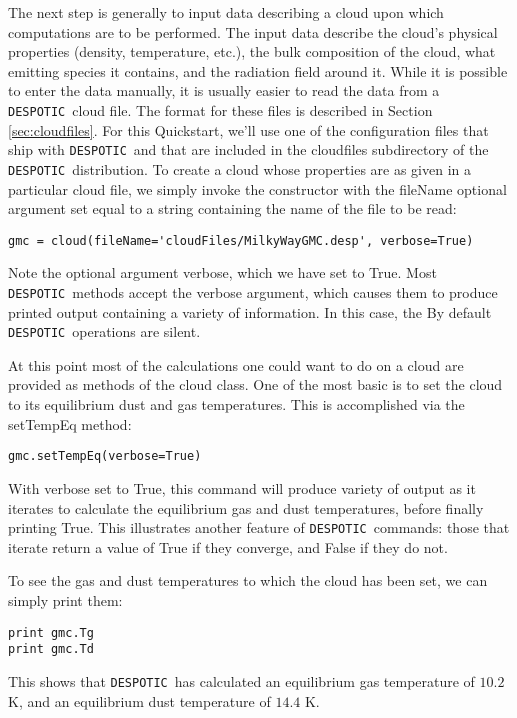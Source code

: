 \documentclass[12pt]{article}
\newcommand{\despotic}{\texttt{DESPOTIC}}
\begin{document}
The next step is generally to input data describing a cloud upon which computations are to be performed. The input data describe the cloud's physical properties (density, temperature, etc.), the bulk composition of the cloud, what emitting species it contains, and the radiation field around it. While it is possible to enter the data manually, it is usually easier to read the data from a \despotic\ cloud file. The format for these files is described in Section \ref{sec:cloudfiles}. For this Quickstart, we'll use one of the configuration files that ship with \despotic\, and that are included in the cloudfiles subdirectory of the \despotic\ distribution. To create a cloud whose properties are as given in a particular cloud file, we simply invoke the constructor with the fileName optional argument set equal to a string containing the name of the file to be read:
\begin{verbatim}
gmc = cloud(fileName='cloudFiles/MilkyWayGMC.desp', verbose=True)
\end{verbatim}
Note the optional argument verbose, which we have set to True. Most \despotic\ methods accept the verbose argument, which causes them to produce printed output containing a variety of information. In this case, the  By default \despotic\ operations are silent.

At this point most of the calculations one could want to do on a cloud are provided as methods of the cloud class. One of the most basic is to set the cloud to its equilibrium dust and gas temperatures. This is accomplished via the setTempEq method:
\begin{verbatim}
gmc.setTempEq(verbose=True)
\end{verbatim}
With verbose set to True, this command will produce variety of output as it iterates to calculate the equilibrium gas and dust temperatures, before finally printing True. This illustrates another feature of \despotic\ commands: those that iterate return a value of True if they converge, and False if they do not.

To see the gas and dust temperatures to which the cloud has been set, we can simply print them:
\begin{verbatim}
print gmc.Tg
print gmc.Td
\end{verbatim}
This shows that \despotic\ has calculated an equilibrium gas temperature of $10.2$ K, and an equilibrium dust temperature of $14.4$ K.
\end{document}
